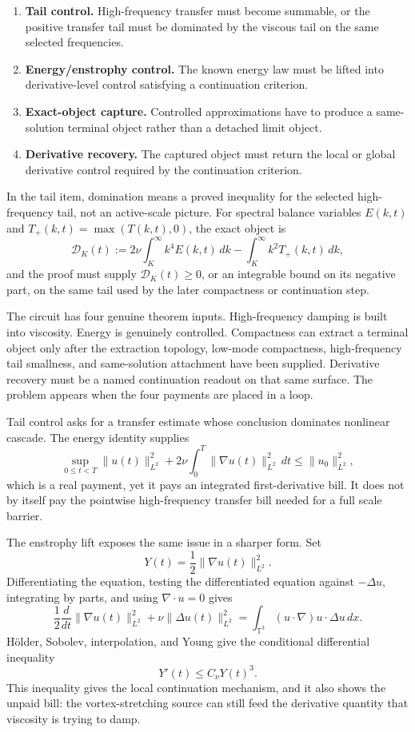 \begin{enumerate}[leftmargin=*]
\item \textbf{Tail control.} High-frequency transfer must become summable, or
      the positive transfer tail must be dominated by the viscous tail on the
      same selected frequencies.
\item \textbf{Energy/enstrophy control.} The known energy law must be lifted
      into derivative-level control satisfying a continuation criterion.
\item \textbf{Exact-object capture.} Controlled approximations have to produce
      a same-solution terminal object rather than a detached limit object.
\item \textbf{Derivative recovery.} The captured object must return the local
      or global derivative control required by the continuation criterion.
\end{enumerate}

In the tail item, domination means a proved inequality for the selected
high-frequency tail, not an active-scale picture. For spectral balance variables
\(E(k,t)\) and \(T_+(k,t)=\max(T(k,t),0)\), the exact object is
\[
  \mathcal D_K(t)
  :=
  2\nu\int_K^\infty k^4E(k,t)\,dk
  -
  \int_K^\infty k^2T_+(k,t)\,dk,
\]
and the proof must supply \(\mathcal D_K(t)\ge0\), or an integrable bound on
its negative part, on the same tail used by the later compactness or
continuation step.

The circuit has four genuine theorem inputs.
High-frequency damping is built into viscosity. Energy is genuinely controlled.
Compactness can extract a terminal object only after the extraction topology,
low-mode compactness, high-frequency tail smallness, and same-solution
attachment have been supplied. Derivative recovery must be a named continuation
readout on that same surface. The problem appears when the four payments are
placed in a loop.

Tail control asks for a transfer estimate whose conclusion dominates nonlinear
cascade. The energy identity supplies
\[
  \sup_{0\le t<T}\|u(t)\|_{L^2}^2
  +2\nu\int_0^T\|\nabla u(t)\|_{L^2}^2\,dt
  \le \|u_0\|_{L^2}^2,
\]
which is a real payment, yet it pays an integrated first-derivative bill. It does
not by itself pay the pointwise high-frequency transfer bill needed for a full
scale barrier.

The enstrophy lift exposes the same issue in a sharper form. Set
\[
  Y(t)=\frac12\|\nabla u(t)\|_{L^2}^2.
\]
Differentiating the equation, testing the differentiated equation against
\(-\Delta u\), integrating by parts, and using \(\nabla\cdot u=0\) gives
\[
  \frac12\frac{d}{dt}\|\nabla u(t)\|_{L^2}^2
  +\nu\|\Delta u(t)\|_{L^2}^2
  =\int_{\mathbb T^3}(u\cdot\nabla)u\cdot\Delta u\,dx.
\]
H\"older, Sobolev, interpolation, and Young give the conditional differential
inequality
\[
  Y'(t)\le C_\nu Y(t)^3.
\]
This inequality gives the local continuation mechanism, and it also shows the unpaid bill:
the vortex-stretching source can still feed the derivative quantity that
viscosity is trying to damp.

